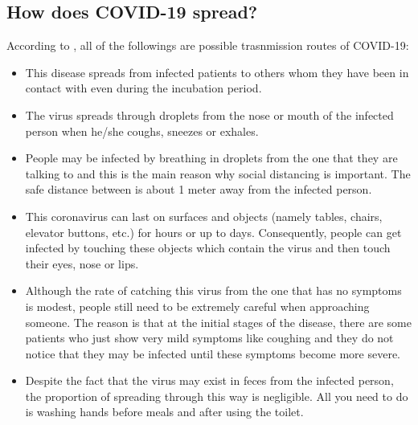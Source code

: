     \subsection{How does COVID-19 spread?}
      \par According to \textcite{Q&A_WHO}, all of the followings are possible trasnmission routes of COVID-19:
      \begin{itemize}
        \item This disease spreads from infected patients to others whom they have been in contact with even during the incubation period.
        \item The virus spreads through droplets from the nose or mouth of the infected person when he/she coughs, sneezes or exhales.
        \item People may be infected by breathing in droplets from the one that they are talking to and this is the main reason why social distancing is important. The safe distance between is about 1 meter away from the infected person.
        \item This coronavirus can last on surfaces and objects (namely tables, chairs, elevator buttons, etc.) for hours or up to days. Consequently, people can get infected by touching these objects which contain the virus and then touch their eyes, nose or lips.
        \item Although the rate of catching this virus from the one that has no symptoms is modest, people still need to be extremely careful when approaching someone. The reason is that at the initial stages of the disease, there are some patients who just show very mild symptoms like coughing and they do not notice that they may be infected until these symptoms become more severe.
        \item Despite the fact that the virus may exist in feces from the infected person, the proportion of spreading through this way is negligible. All you need to do is washing hands before meals and after using the toilet.
      \end{itemize}

